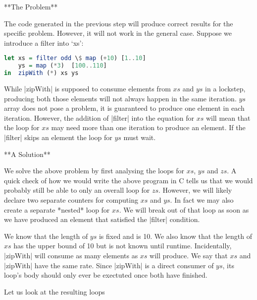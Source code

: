 **The Problem**

The code generated in the previous step will produce correct results for the specific problem. However, it will not work in the general case. Suppose we introduce a filter into `xs':

\begin{lstlisting}[language=haskell]
let xs = filter odd \$ map (+10) [1..10]
    ys = map (*3)  [100..110]
in  zipWith (*) xs ys
\end{lstlisting}

While |zipWith| is supposed to consume elements from $xs$ and $ys$ in a lockstep, producing both those elements will not always happen in the same iteration. $ys$ array does not pose a problem, it is guaranteed to produce one element in each iteration. However, the addition of |filter| into the equation for $xs$ will mean that the loop for $xs$ may need more than one iteration to produce an element. If the |filter| skips an element the loop for $ys$ must wait.

**A Solution**

We solve the above problem by first analysing the loops for $xs$, $ys$ and $zs$. A quick check of how we would write the above program in C tells us that we would probably still be able to only an overall loop for $zs$. However, we will likely declare two separate counters for computing $xs$ and $ys$. In fact we may also create a separate *nested* loop for $xs$. We will break out of that loop as soon as we have produced an element that satisfied the |filter| condition.

We know that the length of $ys$ is fixed and is 10. We also know that the length of $xs$ has the upper bound of 10 but is not known until runtime. Incidentally, |zipWith| will consume as many elements as $xs$ will produce. We say that $xs$ and |zipWith| have the same rate. Since |zipWith| is a direct consumer of $ys$, its loop's body should only ever be exectuted once both have finished.

Let us look at the resulting loops

